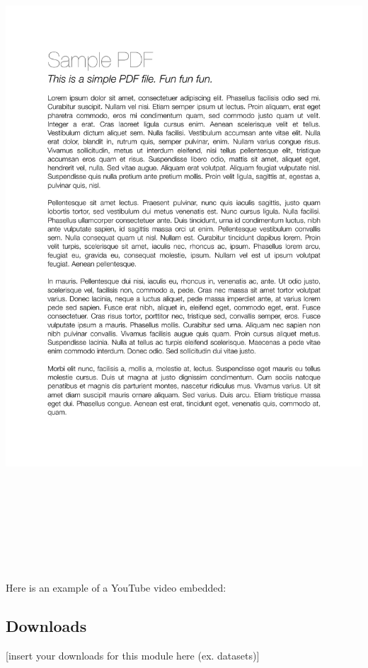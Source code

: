 \documentclass[
]{book}
\begin{document}
\includegraphics[width=1\textwidth,height=9.375in]{content-files/sample-pdf.pdf}~

Here is an example of a YouTube video embedded:

\subsection{Downloads}\label{downloads}

{[}insert your downloads for this module here (ex. datasets){]}
\end{document}
